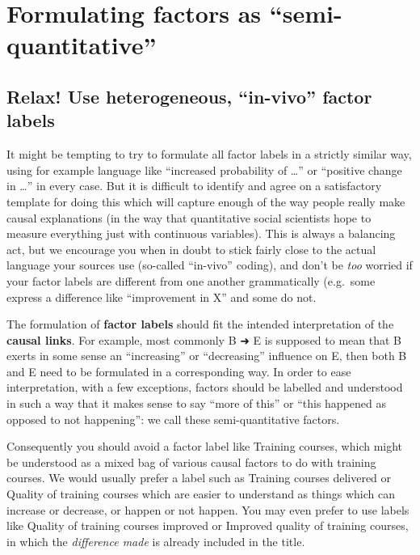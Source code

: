 \documentclass[
]{book}
\begin{document}
\hypertarget{formulating-factors-as-semi-quantitative}{%
\section{Formulating factors as ``semi-quantitative''}\label{formulating-factors-as-semi-quantitative}}

\hypertarget{relax-use-heterogeneous-in-vivo-factor-labels}{%
\subsection{Relax! Use heterogeneous, ``in-vivo'' factor labels}\label{relax-use-heterogeneous-in-vivo-factor-labels}}

It might be tempting to try to formulate all factor labels in a strictly similar way, using for example language like ``increased probability of \ldots{}'' or ``positive change in \ldots{}'' in every case. But it is difficult to identify and agree on a satisfactory template for doing this which will capture enough of the way people really make causal explanations (in the way that quantitative social scientists hope to measure everything just with continuous variables). This is always a balancing act, but we encourage you when in doubt to stick fairly close to the actual language your sources use (so-called ``in-vivo'' coding), and don't be \emph{too} worried if your factor labels are different from one another grammatically (e.g.~some express a difference like ``improvement in X'' and some do not.

The formulation of \textbf{factor labels} should fit the intended interpretation of the \textbf{causal links}. For example, most commonly B ➜ E is supposed to mean that B exerts in some sense an ``increasing'' or ``decreasing'' influence on E, then both B and E need to be formulated in a corresponding way. In order to ease interpretation, with a few exceptions, factors should be labelled and understood in such a way that it makes sense to say ``more of this'' or ``this happened as opposed to not happening'': we call these semi-quantitative factors.

Consequently you should avoid a factor label like Training courses, which might be understood as a mixed bag of various causal factors to do with training courses. We would usually prefer a label such as Training courses delivered or Quality of training courses which are easier to understand as things which can increase or decrease, or happen or not happen. You may even prefer to use labels like Quality of training courses improved or Improved quality of training courses, in which the \emph{difference made} is already included in the title.
\end{document}

